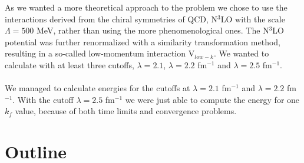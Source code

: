 As we wanted a more
theoretical approach to the problem we chose to use the interactions derived
from the chiral symmetries of QCD, N$^3$LO with the scale $\Lambda=500$ MeV, 
rather than using the more
phenomenological ones. The N$^3$LO potential was further renormalized with a similarity transformation method, resulting in a so-called low-momentum interaction V$_{low-k}$. We wanted to calculate with at least three cutoffs, $\lambda=2.1$, $\lambda=2.2$ fm$^{-1}$ and $\lambda=2.5$ fm$^{-1}$.\\
\\
We managed to calculate energies for the cutoffs at $\lambda=2.1$ fm$^{-1}$ and $\lambda=2.2$ fm$^{-1}$. With the cutoff $\lambda=2.5$ fm$^{-1}$ we were just able to compute the energy for one $k_f$ value, because of both time limits and convergence problems.
\section*{Outline}

